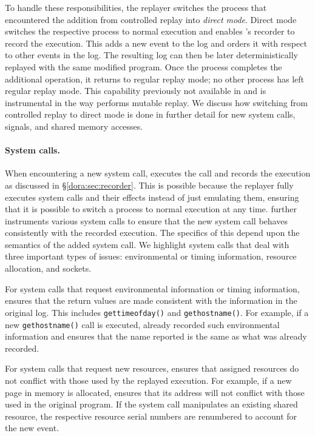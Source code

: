 To handle these responsibilities, the replayer switches the process
that encountered the addition from controlled replay into 
\emph{direct mode}.  Direct mode switches the respective process to  
normal execution  and enables {\dora}'s recorder to record the execution.
This adds a new event to the log and orders it
with respect to other events in the log.
The
resulting log can then be later deterministically replayed with the
same modified program.  Once the process completes the additional
operation, it returns to regular replay mode; no other process has
left regular replay mode.
This capability previously not available in \scribe and \racepro
is instrumental in the way \dora performs mutable replay.
We discuss how switching from controlled replay to direct mode is done in
further detail for new system calls, signals, and shared memory accesses. 

\paragraph{System calls.}
When encountering a new system call, {\dora} executes the
call and records the execution as discussed in \S\ref{dora:sec:recorder}.
This is possible because the replayer fully executes system calls and
their effects instead of just emulating them, ensuring that it is
possible to switch a process to normal execution at any time.
{\dora} further instruments various system calls to ensure that the
new system call behaves consistently with the recorded execution.
The specifics of this depend upon the semantics of the added system
call. We highlight system calls that deal with three important types of issues:
environmental or timing information, resource allocation, and sockets.

For system calls that request environmental information or timing
information, {\dora} ensures that the return values are made
consistent with the information in the original log.  This includes
{\tt gettimeofday()} and {\tt gethostname()}.  For example, if a new
{\tt gethostname()} call is executed, {\dora} already recorded such
environmental information and ensures that the name reported is 
the same as what was already recorded.

For system calls that request new resources, {\dora} ensures that 
assigned resources do not conflict with those used by the replayed
execution.  For example, if a new page in memory is allocated,
{\dora} ensures that its address will not conflict with those used
in the original program.  If the system call manipulates an existing
shared resource, the respective resource serial numbers are renumbered
to account for the new event. 

